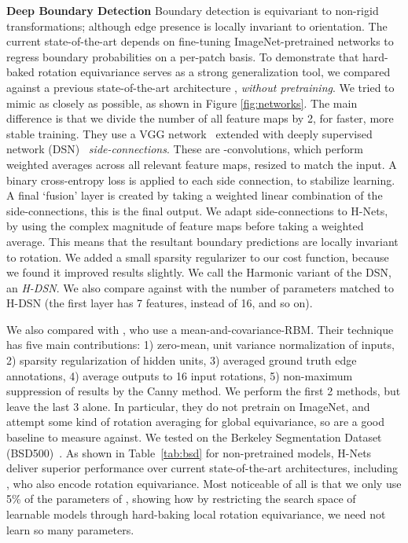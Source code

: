 \documentclass[10pt,twocolumn,letterpaper]{article}
\begin{document}
\textbf{Deep Boundary Detection} Boundary detection is equivariant to non-rigid transformations;
although edge presence is locally invariant to orientation. The
current state-of-the-art depends on fine-tuning ImageNet-pretrained
networks to regress boundary probabilities on a per-patch basis.
To demonstrate that hard-baked rotation equivariance serves as a
strong generalization tool, we compared against a previous state-of-the-art
architecture \cite{xie2015hed}, \emph{without pretraining}. We tried 
to mimic \cite{xie2015hed} as closely as possible, as shown in Figure \ref{fig:networks}. The main difference is
that we divide the number of all feature maps by 2, for faster,
more stable training. They use a VGG network~\cite{simonyan2014vgg} 
extended with deeply supervised network (DSN)~\cite{lee2015deeply} 
\emph{side-connections}. These are -convolutions, which 
perform weighted averages across all relevant feature maps, resized 
to match the input. A binary cross-entropy loss is applied to each 
side connection, to stabilize learning. A final `fusion' layer is 
created by taking a weighted linear combination of the side-connections, 
this is the final output. We adapt side-connections to H-Nets, by
using the complex magnitude of feature maps before taking a weighted
average. This means that the resultant boundary predictions are
locally invariant to rotation. We added a small sparsity regularizer
to our cost function, because we found it improved results slightly.
We call the Harmonic variant of the DSN, an \emph{H-DSN}. We also compare against \cite{xie2015hed} with the number of parameters matched to H-DSN (the first layer has 7 features, instead of 16, and so on).

We also compared with \cite{kivinen2014boundary}, who use a 
mean-and-covariance-RBM. Their technique has five main contributions:
1) zero-mean, unit variance normalization of inputs, 2) sparsity
regularization of hidden units, 3) averaged ground truth edge 
annotations, 4) average outputs to 16 input rotations, 5)
non-maximum suppression of results by the Canny method.
We perform the first 2 methods, but leave the last 3 alone.
In particular, they do not pretrain on ImageNet, and attempt some
kind of rotation averaging for global equivariance, so are a good baseline
to measure against. We tested on the Berkeley Segmentation
Dataset (BSD500)~\cite{arbelaez2011bsd}. As shown in Table~\ref{tab:bsd} 
for non-pretrained models, H-Nets deliver superior performance over 
current state-of-the-art architectures, including \cite{kivinen2014boundary}, 
who also encode rotation equivariance. Most noticeable of all is
that we only use 5\% of the parameters of \cite{xie2015hed}, showing
how by restricting the search space of learnable models through 
hard-baking local rotation equivariance, we need not learn so many
parameters.
\end{document}
